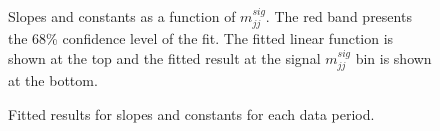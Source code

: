 \begin{figure}[ht]
    \centering
    \caption{Slopes and constants as a function of $m_{jj}^{sig}$. The red band presents the 68\% confidence level of the fit. The fitted linear function is shown at the top and the fitted result at the signal $m_{jj}^{sig}$ bin is shown at the bottom. } 
    \label{fig:mjjReweight1LepResFit}
\end{figure}


\begin{figure}[ht]
    \centering
    \caption{Fitted results for slopes and constants for each data period.} 
    \label{fig:mjjReweight1LepResTotal}
\end{figure}

